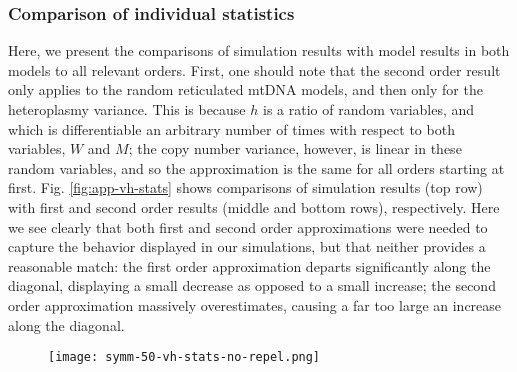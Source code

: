 \documentclass{article}
\begin{document}
\begin{appendices}
\subsubsection{Comparison of individual statistics}
Here, we present the comparisons of simulation results with model results in both models to all relevant orders. First, one should note that the second order result only applies to the random reticulated mtDNA models, and then only for the heteroplasmy variance. This is because $h$ is a ratio of random variables, and which is differentiable an arbitrary number of times with respect to both variables, $W$ and $M$; the copy number variance, however, is linear in these random variables, and so the approximation is the same for all orders starting at first. Fig. \ref{fig:app-vh-stats} shows comparisons of simulation results (top row) with first and second order results (middle and bottom rows), respectively. Here we see clearly that both first and second order approximations were needed to capture the behavior displayed in our simulations, but that neither provides a reasonable match: the first order approximation departs significantly along the diagonal, displaying a small decrease as opposed to a small increase; the second order approximation massively overestimates, causing a far too large an increase along the diagonal.%
\begin{figure}[!ht]
        \centering \texttt{[image: symm-50-vh-stats-no-repel.png]}

\end{figure}
\end{appendices}
\end{document}
